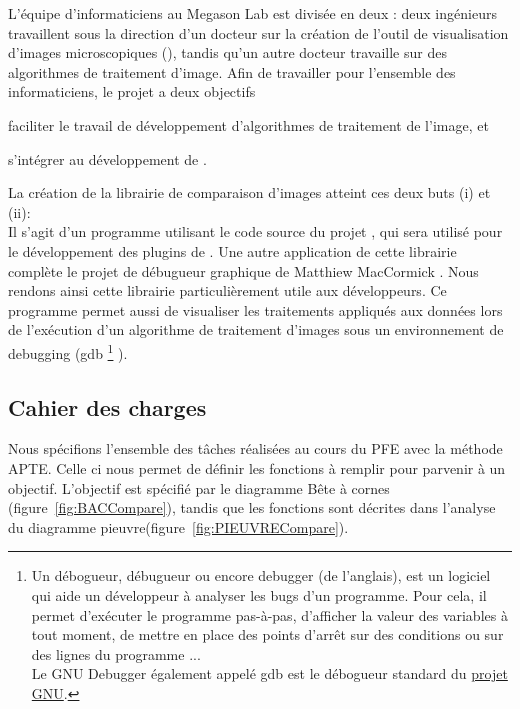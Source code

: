 L'équipe d'informaticiens au Megason Lab est divisée en deux : deux ingénieurs travaillent sous la direction d'un docteur sur la
 création de l'outil de visualisation d'images microscopiques (\gofigure), tandis qu'un autre docteur travaille sur
 des algorithmes de traitement d'image. Afin de travailler pour l'ensemble des informaticiens, le projet a deux objectifs
\begin{inparaenum}[(i)]
  \item faciliter le travail de développement d'algorithmes de traitement de l'image, et 
  \item s'intégrer au développement de {\gofigure}.
\end{inparaenum}

La création de la librairie de comparaison d'images atteint ces deux buts (i) et (ii):\\ 
Il s'agit d'un programme utilisant le code source du projet {\gofigure}, 
qui sera utilisé pour le développement des plugins de {\gofigure}.
Une autre application de cette librairie complète le projet de débugueur graphique de 
Matthiew MacCormick \cite{McCornic-VisualDebug}. Nous rendons ainsi cette librairie particulièrement utile
aux développeurs.
Ce programme permet aussi de visualiser les traitements appliqués aux données
lors de l'exécution d'un algorithme de traitement d'images sous un environnement de debugging (gdb
\footnote{Un débogueur, débugueur ou encore debugger (de l'anglais), est un logiciel qui aide un développeur à analyser les bugs d'un programme. Pour cela, il permet d'exécuter le programme pas-à-pas, d'afficher la valeur des variables à tout moment, de mettre en place des points d'arrêt sur des conditions ou sur des lignes du programme ...\\
Le GNU Debugger également appelé gdb est le débogueur standard du \href{http://fr.wikipedia.org/wiki/Projet_GNU}{projet GNU}.} ).


\subsection{Cahier des charges}

Nous spécifions l'ensemble des tâches réalisées au cours du PFE avec la méthode APTE{\textregistered}{\cite{methodeAPTE}}. Celle ci nous permet de définir les fonctions à remplir pour parvenir à un objectif. L'objectif est spécifié par le diagramme Bête à cornes (figure~\ref{fig:BACCompare}), tandis que les fonctions sont décrites dans l'analyse du diagramme pieuvre(figure~\ref{fig:PIEUVRECompare}).

